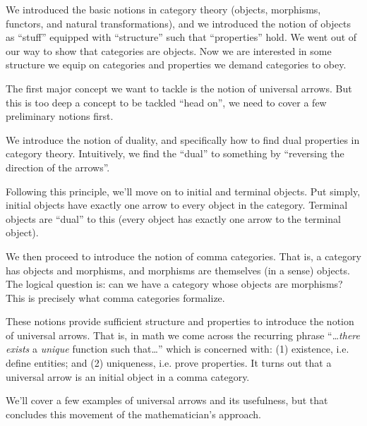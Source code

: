 
We introduced the basic notions in category theory (objects,
morphisms, functors, and natural transformations), and we
introduced the notion of objects as ``stuff'' equipped with
``structure'' such that ``properties'' hold. We went out of our
way to show that categories are objects. Now we are interested in
some structure we equip on categories and properties we demand
categories to obey.

The first major concept we want to tackle is the notion of
universal arrows. But this is too deep a concept to be tackled
``head on'', we need to cover a few preliminary notions first.

We introduce the notion of duality, and specifically how to find
dual properties in category theory. Intuitively, we find the
``dual'' to something by ``reversing the direction of the
arrows''. 

Following this principle, we'll move on to initial and terminal
objects. Put simply, initial objects have exactly one arrow to
every object in the category. Terminal objects are ``dual'' to
this (every object has exactly one arrow to the terminal object).


We then proceed to introduce the notion of comma categories. That
is, a category has objects and morphisms, and morphisms are
themselves (in a sense) objects. The logical question is: can we
have a category whose objects are morphisms? This is precisely
what comma categories formalize.

These notions provide sufficient structure and properties to
introduce the notion of universal arrows. That is, in math we
come across the recurring phrase ``\ldots\emph{there exists} a
\emph{unique} function such that\ldots'' which is concerned with:
(1) existence, i.e. define entities; and (2) uniqueness,
i.e. prove properties. It turns out that a universal arrow is an
initial object in a comma category. 

We'll cover a few examples of universal arrows and its
usefulness, but that concludes this movement of the
mathematician's approach.

